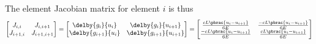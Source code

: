The element Jacobian matrix for element $i$ is thus
\begin{equation}
  \begin{bmatrix}
    J_{i,i} & J_{i,i+1} \\
    J_{i+1,i} & J_{i+1,i+1} 
  \end{bmatrix} = \begin{bmatrix}
    \delby{g_{i}}{u_{i}} & \delby{g_{i}}{u_{i+1}} \\
    \delby{g_{i+1}}{u_{i}} & \delby{g_{i+1}}{u_{i+1}}
   \end{bmatrix} = \begin{bmatrix}
    \frac{cL\pbrac{u_{i}-u_{i+1}}}{6E} & \frac{-cL\pbrac{u_{i}-u_{i+1}}}{6E} \\
    \frac{-cL\pbrac{u_{i}-u_{i+1}}}{6E} & \frac{cL\pbrac{u_{i}-u_{i+1}}}{6E}
   \end{bmatrix}
\end{equation}

